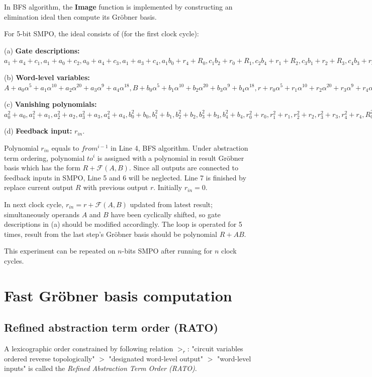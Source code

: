 In BFS algorithm, the \textbf{Image} function is implemented by constructing an elimination ideal then 
compute its Gr\"obner basis. 
\begin{Example}
\label{ex:SMPO}
For 5-bit SMPO, the ideal consists of (for the first clock cycle):

(a) {\bf Gate descriptions:}
$a_1+a_4+c_1, a_1+a_0+c_2, a_0+a_4+c_3, a_1+a_3+c_4,
		  a_1b_0+r_4+R_0, c_1b_2+r_0+R_1, c_2b_4+r_1+R_2, c_3b_1+r_2+R_3, c_4b_3+r_3+R_4;$
		  
(b) {\bf Word-level variables:}
$A+a_0\alpha^5+a_1\alpha^{10}+a_2\alpha^{20}+a_3\alpha^9+a_4\alpha^{18},
		  B+b_0\alpha^5+b_1\alpha^{10}+b_2\alpha^{20}+b_3\alpha^9+b_4\alpha^{18},
		  r+r_0\alpha^5+r_1\alpha^{10}+r_2\alpha^{20}+r_3\alpha^9+r_4\alpha^{18},
		  R+R_0\alpha^5+R_1\alpha^{10}+R_2\alpha^{20}+R_3\alpha^9+R_4\alpha^{18};$
		  
(c) {\bf Vanishing polynomials:}
		 $ a_0^2+a_0, a_1^2+a_1, a_2^2+a_2, a_3^2+a_3, a_4^2+a_4,
		  b_0^2+b_0, b_1^2+b_1, b_2^2+b_2, b_3^2+b_3, b_4^2+b_4,
		  r_0^2+r_0, r_1^2+r_1, r_2^2+r_2, r_3^2+r_3, r_4^2+r_4,
		  R_0^2+R_0, R_1^2+R_1, R_2^2+R_2, R_3^2+R_3, R_4^2+R_4,
		  c_1^2+c_1, c_2^2+c_2, c_3^2+c_3, c_4^2+c_4,
		  A^{32}+A, B^{32}+B, r^{32}+r, R^{32}+R;$
		  
(d)	{\bf Feedback input:}	  $r_{in}$.

Polynomial $r_{in}$ equals to $from^{i-1}$ in Line 4, BFS algorithm. Under abstraction term ordering,
polynomial $to^i$ is assigned with a polynomial in result Gr\"obner basis which has the form $R + \mathcal{F}(A,B)$. 
Since all outputs are connected to feedback inputs
in SMPO, Line 5 and 6 will be neglected. Line 7 is finished by replace current output $R$ with previous 
output $r$. Initially $r_{in} = 0$.

In next clock cycle, $r_{in} = r + \mathcal{F}(A,B)$ updated from latest result; simultaneously operands
$A$ and $B$ have been cyclically shifted, so gate descriptions in (a) should be modified accordingly. The 
loop is operated for 5 times, result from the last step's Gr\"obner basis should be polynomial $R + AB$.
\end{Example}

This experiment can be repeated on $n$-bits SMPO after running for $n$ clock cycles.

\section{Fast Gr\"obner basis computation}
\subsection{Refined abstraction term order (RATO)}
A lexicographic order constrained by following relation $>_{r}$: "circuit variables ordered reverse topologically" $>$ 
"designated word-level output" $>$ "word-level inputs" is called the \emph{Refined Abstraction Term Order (RATO)}.

